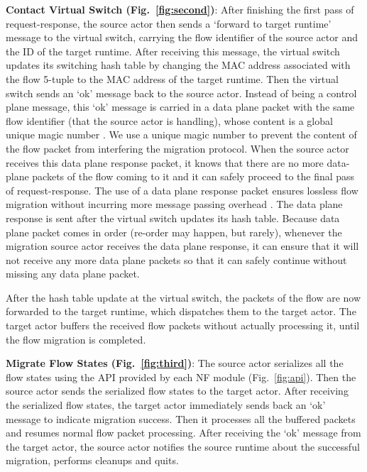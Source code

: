 \textbf{Contact Virtual Switch (Fig.~\ref{fig:second})}: After finishing the first pass of request-response, the source actor then sends a `forward to target runtime' message to the virtual switch, carrying the flow identifier of the source actor and the ID of the target runtime. After receiving this message, the virtual switch updates its switching hash table by changing the MAC address associated with the flow 5-tuple %
to the MAC address of the target runtime. Then the virtual switch sends an `ok' message back to the source actor. Instead of being a control plane message, this `ok' message is carried in a data plane packet with the same flow identifier (that the source actor is handling), whose content is a global unique magic number %
. We use a unique magic number to prevent the content of the flow packet from interfering the migration protocol. When the source actor receives this data plane response packet, it knows that there are no more data-plane packets of the flow coming to it and it can safely proceed to the final pass of request-response. The use of a data plane response packet ensures lossless flow migration \cite{gember2015opennf} without incurring more message passing overhead %
. The data plane response is sent after the virtual switch updates its hash table. Because data plane packet comes in order (re-order may happen, but rarely), whenever the migration source actor receives the data plane response, it can ensure that it will not receive any more data plane packets so that it can safely continue without missing any data plane packet. 

After the hash table update at the virtual switch, the packets of the flow are now forwarded to the target runtime, which dispatches them to the target actor. The target actor buffers the received flow packets without actually processing it, until the flow migration is completed.



\textbf{Migrate Flow States (Fig.~\ref{fig:third})}: The source actor serializes all the flow states using the API provided by each NF module (Fig.~\ref{fig:api}). Then the source actor sends the serialized flow states to the target actor. After receiving the serialized flow states, the target actor immediately sends back an `ok' message to indicate migration success. Then it processes all the buffered packets and resumes normal flow packet processing. After receiving the `ok' message from the target actor, the source actor notifies the source runtime about the successful migration, performs cleanups and quits.



